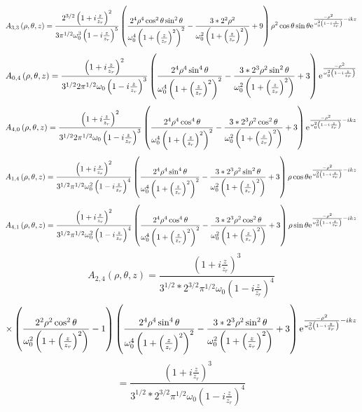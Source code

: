 \documentclass[11pt]{amsart}
\makeatletter
\newcommand{\e}{{\rm e}}				%
\newcommand{\0}{\varnothing}		%
\newcommand{\1}{!}
\newcommand{\2}{@}
\newcommand{\3}{\#}
\newcommand{\4}{\$}
\newcommand{\5}{\%}
\newcommand{\6}{$^\wedge$}
\newcommand{\7}{\&}
\newcommand{\8}{*}
\newcommand{\9}{(}
\makeatother
\begin{document}
\[
A_{3,3}\left(\rho,\theta,z\right) = \frac{2^{3/2}\left(1+i\frac{z}{z_r}\right)^2}{3\pi^{1/2}\omega_0^3\left(1-i\frac{z}{z_r}\right)^5}\left(\frac{2^4\rho^4\cos^2\theta\sin^2\theta}{\omega_0^4\left(1+\left(\frac{z}{z_r}\right)^2\right)^2}-\frac{3*2^2\rho^2}{\omega_0^2\left(1+\left(\frac{z}{z_r}\right)^2\right)}+9\right)\rho^2\cos\theta\sin\theta\e^{\frac{-\rho^2}{\omega_0^2\left(1-i\frac{z}{z_r}\right)}-ikz}
\]
\[
A_{0,4}\left(\rho,\theta,z\right) = \frac{\left(1+i\frac{z}{z_r}\right)^2}{3^{1/2}2\pi^{1/2}\omega_0\left(1-i\frac{z}{z_r}\right)^3}\left(\frac{2^4\rho^4\sin^4\theta}{\omega_0^4\left(1+\left(\frac{z}{z_r}\right)^2\right)^2}-\frac{3*2^3\rho^2\sin^2\theta}{\omega_0^2\left(1+\left(\frac{z}{z_r}\right)^2\right)}+3\right)\e^{\frac{-\rho^2}{\omega_0^2\left(1-i\frac{z}{z_r}\right)}}
\]
\[
A_{4,0}\left(\rho,\theta,z\right) = \frac{\left(1+i\frac{z}{z_r}\right)^2}{3^{1/2}2\pi^{1/2}\omega_0\left(1-i\frac{z}{z_r}\right)^3}\left(\frac{2^4\rho^4\cos^4\theta}{\omega_0^4\left(1+\left(\frac{z}{z_r}\right)^2\right)^2}-\frac{3*2^3\rho^2\cos^2\theta}{\omega_0^2\left(1+\left(\frac{z}{z_r}\right)^2\right)}+3\right)\e^{\frac{-\rho^2}{\omega_0^2\left(1-i\frac{z}{z_r}\right)}-ikz}
\]
\[
A_{1,4} \left(\rho,\theta,z\right) = \frac{\left(1+i\frac{z}{z_r}\right)^2}{3^{1/2}\pi^{1/2}\omega_0^2\left(1-i\frac{z}{z_r}\right)^4}\left(\frac{2^4\rho^4\sin^4\theta}{\omega_0^4\left(1+\left(\frac{z}{z_r}\right)^2\right)^2}-\frac{3*2^3\rho^2\sin^2\theta}{\omega_0^2\left(1+\left(\frac{z}{z_r}\right)^2\right)}+3\right)\rho \cos \theta\e^{\frac{-\rho^2}{\omega_0^2\left(1-i\frac{z}{z_r}\right)}-ikz}
\]
\[
A_{4,1} \left(\rho,\theta,z\right) = \frac{\left(1+i\frac{z}{z_r}\right)^2}{3^{1/2}\pi^{1/2}\omega_0^2\left(1-i\frac{z}{z_r}\right)^4}\left(\frac{2^4\rho^4\cos^4\theta}{\omega_0^4\left(1+\left(\frac{z}{z_r}\right)^2\right)^2}-\frac{3*2^3\rho^2\cos^2\theta}{\omega_0^2\left(1+\left(\frac{z}{z_r}\right)^2\right)}+3\right)\rho \sin \theta \e^{\frac{-\rho^2}{\omega_0^2\left(1-i\frac{z}{z_r}\right)}-ikz}
\]
\[
A_{2,4}\left(\rho,\theta,z\right)= \frac{\left(1+i\frac{z}{z_r}\right)^3}{3^{1/2}*2^{3/2}\pi^{1/2}\omega_0\left(1-i\frac{z}{z_r}\right)^4}\]\[\times\left(\frac{2^2\rho^2\cos^2\theta}{\omega_0^2\left(1+\left(\frac{z}{z_r}\right)^2\right)}-1\right)\left(\frac{2^4\rho^4\sin^4\theta}{\omega_0^4\left(1+\left(\frac{z}{z_r}\right)^2\right)^2}-\frac{3*2^3\rho^2\sin^2\theta}{\omega_0^2\left(1+\left(\frac{z}{z_r}\right)^2\right)}+3\right) \e^{\frac{-\rho^2}{\omega_0^2\left(1-i\frac{z}{z_r}\right)}-ikz}
\]
\[
= \frac{\left(1+i\frac{z}{z_r}\right)^3}{3^{1/2}*2^{3/2}\pi^{1/2}\omega_0\left(1-i\frac{z}{z_r}\right)^4}
\]
\end{document}
